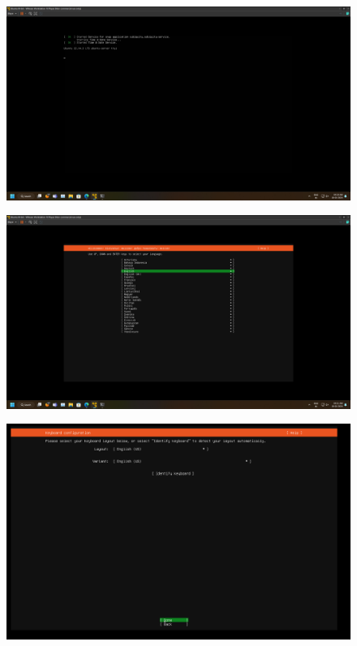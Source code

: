 \documentclass[11pt]{article}
\begin{document}
\begin{figure}[H]
    \centering
    \includegraphics[width=.95\textwidth]{screenshots/7.png}
    \caption{}
\end{figure}
\begin{figure}[H]
    \centering
    \includegraphics[width=.95\textwidth]{screenshots/8.png}
    \caption{}
\end{figure}
\begin{figure}[H]
    \centering
    \includegraphics[width=.95\textwidth]{screenshots/9.png}
    \caption{}
\end{figure}
\end{document}
